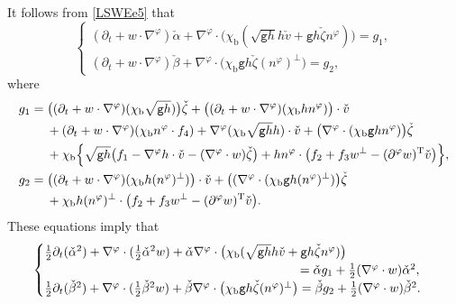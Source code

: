 \documentclass[11pt]{article}
\newcommand{\gr}{{\mathtt g}}
\newcommand{\dt}{\partial_t}
\theoremstyle{definition}
\begin{document}
It follows from \eqref{LSWEe5} that
\[
\begin{cases}
(\dt + w\cdot\nabla^\varphi)\check{\alpha} + \nabla^\varphi\cdot\bigl(\chi_\mathrm{b}(\sqrt{\gr h}h\check{v} + \gr h \check{\zeta}n^\varphi)\bigr) = g_1, \\
(\dt+w\cdot\nabla^\varphi)\check{\beta}
+ \nabla^\varphi\cdot\bigl(\chi_\mathrm{b}\gr h\check{\zeta}(n^\varphi)^\perp\bigr) = g_2,
\end{cases}
\]
where
\begin{align*}
g_1
&= \bigl((\dt+w\cdot\nabla^\varphi)(\chi_\mathrm{b}\sqrt{\gr h})\bigr)\check{\zeta} + \bigl((\dt+w\cdot\nabla^\varphi)(\chi_\mathrm{b}h n^\varphi)\bigr)\cdot\check{v} \\
&\quad\;
+ (\dt+w\cdot\nabla^\varphi)(\chi_\mathrm{b}n^\varphi\cdot f_4)
+ \nabla^\varphi(\chi_\mathrm{b}\sqrt{\gr h}h)\cdot\check{v} + \bigl(\nabla^\varphi\cdot(\chi_\mathrm{b}\gr h n^\varphi)\bigr)\check{\zeta} \\
&\quad\;
+ \chi_\mathrm{b}\Bigl\{ \sqrt{\gr h}\bigl(f_1-\nabla^\varphi h\cdot\check{v}-(\nabla^\varphi\cdot w)\check{\zeta}\bigr)
+ h n^\varphi\cdot\bigl(f_2 + f_3w^\perp-(\partial^\varphi w)^\mathrm{T}\check{v}\bigr)\Bigr\}, \\
g_2
&= \bigl((\dt+w\cdot\nabla^\varphi)(\chi_\mathrm{b}h(n^\varphi)^\perp)\bigr)\cdot\check{v} + \bigl((\nabla^\varphi\cdot(\chi_\mathrm{b}\gr h(n^\varphi)^\perp)\bigr)\check{\zeta} \\
&\quad\;
+ \chi_\mathrm{b}h(n^\varphi)^\perp\cdot\bigl(f_2 + f_3w^\perp-(\partial^\varphi w)^\mathrm{T}\check{v}\bigr).
\end{align*}
These equations imply that
\begin{equation}\label{EqCF1}
\begin{cases}
\frac12\dt(\check{\alpha}^2) + \nabla^\varphi\cdot(\frac12\check{\alpha}^2w)
+ \check{\alpha}\nabla^\varphi\cdot\bigl(\chi_\mathrm{b}(\sqrt{\gr h}h\check{v} + \gr h\check{\zeta}n^\varphi)\bigr)\\
\hphantom{\frac12\dt(\check{\beta}^2) + \nabla^\varphi\cdot(\frac12\check{\beta}^2w)
+ \check{\beta}\nabla^\varphi\cdot(\chi_\mathrm{b}\gr h\check{\zeta}(n^\varphi)^\perp)}= \check{\alpha}g_1 + \frac12(\nabla^\varphi\cdot w)\check{\alpha}^2, \\
\frac12\dt(\check{\beta}^2) + \nabla^\varphi\cdot(\frac12\check{\beta}^2w)
+ \check{\beta}\nabla^\varphi\cdot\bigl(\chi_\mathrm{b}\gr h\check{\zeta}(n^\varphi)^\perp\bigr)
= \check{\beta}g_2 + \frac12(\nabla^\varphi\cdot w)\check{\beta}^2.
\end{cases}
\end{equation}
\end{document}
